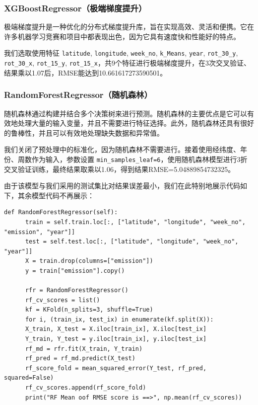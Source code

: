 \documentclass{ctexart}
\begin{document}
\begin{sloppypar}
\subsubsection{XGBoostRegressor（极端梯度提升）}

极端梯度提升是一种优化的分布式梯度提升库，旨在实现高效、灵活和便携。它在许多机器学习竞赛和项目中都表现出色，因为它具有速度快和性能好的特点。

我们选取使用特征 \texttt{latitude}, \texttt{longitude}, \texttt{week\_no}, \texttt{k\_Means}, \texttt{year}, \texttt{rot\_30\_y}, \texttt{rot\_30\_x}, \texttt{rot\_15\_y}, \texttt{rot\_15\_x}，共9个特征进行极端梯度提升，在3次交叉验证、结果乘以1.07后，RMSE能达到10.661617273590501。

\subsubsection{RandomForestRegressor（随机森林）}

随机森林通过构建并结合多个决策树来进行预测。随机森林的主要优点是它可以有效地处理大量的输入变量，并且不需要进行特征选择。此外，随机森林还具有很好的鲁棒性，并且可以有效地处理缺失数据和异常值。

我们关闭了预处理中的标准化，因为随机森林不需要进行。接着使用经纬度、年份、周数作为输入，参数设置 \texttt{min\_samples\_leaf=6}，使用随机森林模型进行3折交叉验证训练，最终结果取乘以1.06，得到结果RMSE=5.04889854732325。

由于该模型与我们采用的测试集比对结果误差最小，我们在此特别地展示代码如下，其余模型代码不再展示：

\begin{lstlisting}[style=Python]
def RandomForestRegressor(self):
      train = self.train.loc[:, ["latitude", "longitude", "week_no", "emission", "year"]]
      test = self.test.loc[:, ["latitude", "longitude", "week_no", "year"]]
      X = train.drop(columns=["emission"])
      y = train["emission"].copy()

      rfr = RandomForestRegressor()
      rf_cv_scores = list()
      kf = KFold(n_splits=3, shuffle=True)
      for i, (train_ix, test_ix) in enumerate(kf.split(X)):
      X_train, X_test = X.iloc[train_ix], X.iloc[test_ix]
      Y_train, Y_test = y.iloc[train_ix], y.iloc[test_ix]
      rf_md = rfr.fit(X_train, Y_train)
      rf_pred = rf_md.predict(X_test)
      rf_score_fold = mean_squared_error(Y_test, rf_pred, squared=False)
      rf_cv_scores.append(rf_score_fold)
      print("RF Mean oof RMSE score is ==>", np.mean(rf_cv_scores))


\end{lstlisting}
\end{sloppypar}
\end{document}
